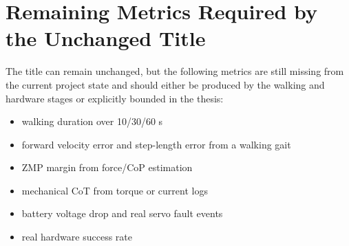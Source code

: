\section{Remaining Metrics Required by the Unchanged Title}
The title can remain unchanged, but the following metrics are still missing
from the current project state and should either be produced by the walking and
hardware stages or explicitly bounded in the thesis:
\begin{itemize}
    \item walking duration over 10/30/60 s
    \item forward velocity error and step-length error from a walking gait
    \item ZMP margin from force/CoP estimation
    \item mechanical CoT from torque or current logs
    \item battery voltage drop and real servo fault events
    \item real hardware success rate
\end{itemize}
